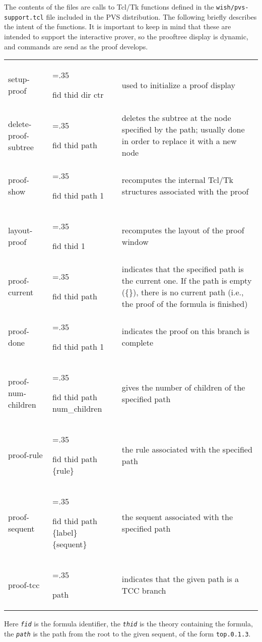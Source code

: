 \documentclass[12pt]{book}
\newcommand{\functionarg}[1]{\texttt{\textit{#1}}}
\begin{document}
The contents of the files are calls to Tcl/Tk functions defined in the
\texttt{wish/pvs-support.tcl} file included in the PVS distribution.  The
following briefly describes the intent of the functions.  It is important
to keep in mind that these are intended to support the interactive prover,
so the prooftree display is dynamic, and commands are send as the proof
develops.

\begin{tabularx}{\linewidth}%
{>{\ttfamily}l%
 >{\hsize=.35\hsize\ttfamily\itshape\raggedright\arraybackslash}X%
 >{\hsize=1.65\hsize\raggedright\arraybackslash}X}
setup-proof & fid thid dir ctr & used to initialize a proof display \\
delete-proof-subtree
  & fid thid path
  & deletes the subtree at the node specified by the path; usually done in
    order to replace it with a new node \\
proof-show
  & fid thid path 1
  & recomputes the internal Tcl/Tk structures associated with the proof \\
layout-proof
  & fid thid 1
  & recomputes the layout of the proof window \\
proof-current
  & fid thid path
  & indicates that the specified path is the current one.  If
    the path is empty (\{\}), there is no current path (i.e., the proof of
    the formula is finished) \\
proof-done
  & fid thid path 1
  & indicates the proof on this branch is complete \\
proof-num-children
  & fid thid path num\_children
  & gives the number of children of the specified path \\
proof-rule
  & fid thid path \{rule\}
  & the rule associated with the specified path \\
proof-sequent
  & fid thid path \{label\} \{sequent\}  
  & the sequent associated with the specified path \\
proof-tcc
  & path
  & indicates that the given path is a TCC branch \\
\end{tabularx}

Here \functionarg{fid} is the formula identifier, the \functionarg{thid}
is the theory containing the formula, the \functionarg{path} is the path
from the root to the given sequent, of the form \texttt{top.0.1.3}.




{\smaller
\printindex
}
\end{document}
